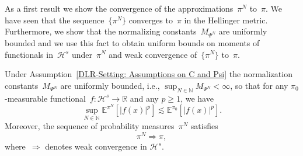 As a first result we show the convergence of the approximations~$\pi^N$ to~$\pi$. We have seen that the sequence~$\{ \pi^N \}$ converges to~$\pi$ in the Hellinger metric. Furthermore, we show that the normalizing constants~$M_{\Psi^N}$ are uniformly bounded and we use this fact to obtain uniform bounds on moments of functionals in~$\mathcal{H}^s$ under~$\pi^N$ and weak convergence of~$\{ \pi^N \}$ to~$\pi$.

\begin{lemma}\autocite[Lemma 3.5, Lemma 4.3]{Mattingly2010, Pillai2012}
  \label{DLR-Proof: Lemma Convergence of pi^N to pi}
  Under Assumption~\ref{DLR-Setting: Assumptions on C and Psi} the normalization constants~$M_{\Psi^N}$ are uniformly bounded, i.e., $ \sup_{N \in \mathbb{N}} M_{\Psi^N} < \infty$, so that for any $\pi_0$-measurable functional~$f: \mathcal{H}^s \to \mathbb{R}$ and any $p\geq 1$, we have
  \begin{equation*}
    \sup_{N \in \mathbb{N}} \mathbb{E}^{\pi^N} [| f(x) |^p] \lesssim \mathbb{E}^{\pi_0}[|f(x)|^p].
  \end{equation*}
  Moreover, the sequence of probability measures~$\pi^N$ satisfies
  \begin{equation*}
   \pi^N \Longrightarrow \pi,
  \end{equation*}
  where~$\Longrightarrow$ denotes weak convergence in $\mathcal{H}^s$.
 
\end{lemma}

